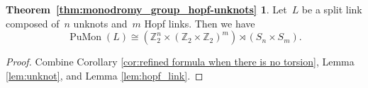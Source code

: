 \documentclass{amsart}
\theoremstyle{definition}
\theoremstyle{definition}
\theoremstyle{definition}
\theoremstyle{definition}
\newtheorem*{thm:hopf}{Theorem~\ref{thm:monodromy_group_hopf-unknots}}
\newcommand{\Z}{\mathbb{Z}}
\DeclareMathOperator{\PuMon}{PuMon}
\begin{document}
\begin{thm:hopf}
    Let~$L$ be a split link composed of~$n$ unknots and~$m$ Hopf links. Then we have 
   ~$$\PuMon(L)\cong \left(\Z_2^n \times (\Z_2\times \Z_2)^m\right) \rtimes (S_n\times S_m).$$
\end{thm:hopf}

\begin{proof}
    Combine Corollary \ref{cor:refined formula when there is no torsion}, Lemma \ref{lem:unknot}, and Lemma \ref{lem:hopf_link}.
\end{proof}




\end{document}
